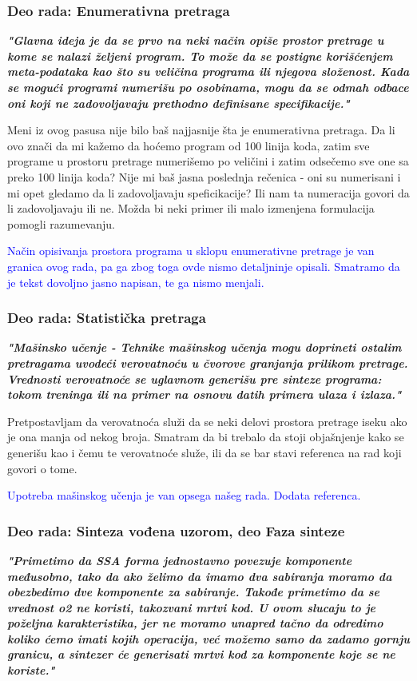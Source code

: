\documentclass[a4paper]{report}
\newcommand{\odgovor}[1]{\textcolor{blue}{#1}}
\begin{document}
\subsubsection{Deo rada: Enumerativna pretraga}
\textbf{\textit{"Glavna ideja je da se prvo na neki način opiše prostor pretrage u kome se nalazi željeni program. To može da se postigne korišćenjem meta-podataka kao što su veličina programa ili
njegova složenost. Kada se mogući programi numerišu po osobinama, mogu da se odmah odbace oni koji ne zadovoljavaju prethodno definisane specifikacije."}}

Meni iz ovog pasusa nije bilo baš najjasnije šta je enumerativna pretraga. Da li ovo znači da mi kažemo da hoćemo program od 100 linija koda, zatim sve programe u prostoru pretrage numerišemo po veličini i zatim odsečemo sve one sa preko 100 linija koda? Nije mi baš jasna poslednja rečenica - oni su numerisani i mi opet gledamo da li zadovoljavaju speficikacije? Ili nam ta numeracija govori da li zadovoljavaju ili ne. Možda bi neki primer ili malo izmenjena formulacija pomogli razumevanju.

\odgovor{Način opisivanja prostora programa u sklopu enumerativne pretrage je van granica ovog rada, pa ga zbog toga ovde nismo detaljninje opisali. Smatramo da je tekst dovoljno jasno napisan, te ga nismo menjali.}


\subsubsection{Deo rada: Statistička pretraga}
\textbf{\textit{"Mašinsko učenje - Tehnike mašinskog učenja mogu doprineti ostalim pretragama uvodeći verovatnoću u čvorove granjanja prilikom pretrage. Vrednosti verovatnoće se uglavnom generišu pre sinteze programa: tokom treninga ili na primer na osnovu datih primera ulaza i izlaza."}}

Pretpostavljam da verovatnoća služi da se neki delovi prostora pretrage iseku ako je ona manja od nekog broja. Smatram da bi trebalo da stoji objašnjenje kako se generišu kao i čemu te verovatnoće služe, ili da se bar stavi referenca na rad koji govori o tome.

\odgovor {Upotreba mašinskog učenja je van opsega našeg rada. Dodata referenca.}


\subsubsection{Deo rada: Sinteza vođena uzorom, deo Faza sinteze}
\textbf{\textit{"Primetimo da SSA forma jednostavno povezuje komponente međusobno, tako da ako želimo da imamo dva sabiranja moramo da obezbedimo dve komponente za sabiranje. Takođe primetimo da se vrednost o2 ne koristi, takozvani mrtvi kod. U ovom slucaju to je poželjna karakteristika, jer ne moramo unapred tačno da odredimo koliko ćemo imati kojih operacija, već možemo samo da zadamo gornju granicu, a sintezer će generisati mrtvi kod za komponente koje se ne koriste."}}
\end{document}
